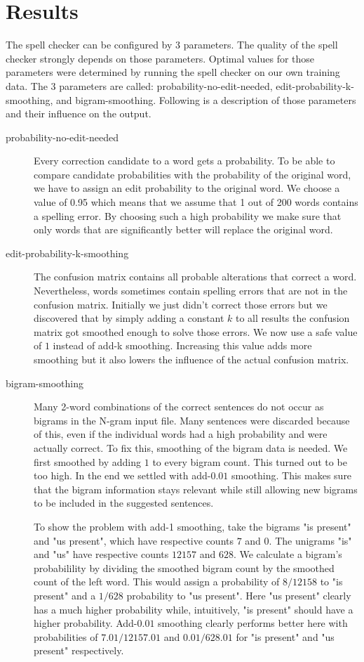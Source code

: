 \documentclass[11pt,a4paper]{article}
\begin{document}
\section{Results}
The spell checker can be configured by 3 parameters. The quality of the spell checker strongly depends on those parameters. Optimal values for those parameters were determined by running the spell checker on our own training data. The 3 parameters are called: probability-no-edit-needed, edit-probability-k-smoothing, and bigram-smoothing. Following is a description of those parameters and their influence on the output.
\begin{description}
\item[probability-no-edit-needed] Every correction candidate to a word gets a probability. To be able to compare candidate probabilities with the probability of the original word, we have to assign an edit probability to the original word. We choose a value of 0.95 which means that we assume that 1 out of 200 words contains a spelling error. By choosing such a high probability we make sure that only words that are significantly better will replace the original word.

\item[edit-probability-k-smoothing] The confusion matrix contains all probable alterations that correct a word. Nevertheless, words sometimes contain spelling errors that are not in the confusion matrix. Initially we just didn't correct those errors but we discovered that by simply adding a constant $k$ to all results the confusion matrix got smoothed enough to solve those errors. We now use a safe value of $1$ instead of add-k smoothing. Increasing this value adds more smoothing but it also lowers the influence of the actual confusion matrix.

\item[bigram-smoothing] Many 2-word combinations of the correct sentences do not occur as bigrams in the N-gram input file. Many sentences were discarded because of this, even if the individual words had a high probability and were actually correct. To fix this, smoothing of the bigram data is needed. We first smoothed by adding $1$ to every bigram count. This turned out to be too high. In the end we settled with add-$0.01$ smoothing. This makes sure that the bigram information stays relevant while still allowing new bigrams to be included in the suggested sentences.

To show the problem with add-1 smoothing, take the bigrams "is present" and "us present", which have respective counts $7$ and $0$. The unigrams "is" and "us" have respective counts $12157$ and $628$. We calculate a bigram's probabilility by dividing the smoothed bigram count by the smoothed count of the left word. This would assign a probability of $8/12158$ to "is present" and a $1/628$ probability to "us present". Here "us present" clearly has a much higher probability while, intuitively, "is present" should have a higher probability. Add-$0.01$ smoothing clearly performs better here with probabilities of $7.01/12157.01$ and $0.01/628.01$ for "is present" and "us present" respectively.
\end{description}
\end{document}
